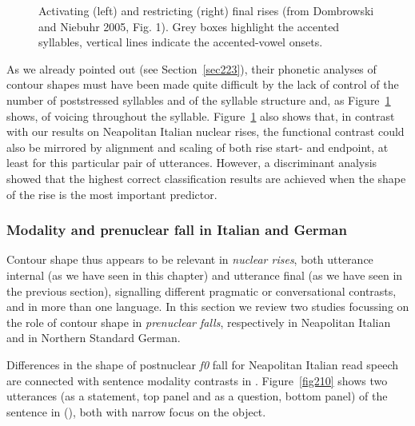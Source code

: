 \begin{figure}
\centering
{}
\caption{Activating (left) and restricting (right) final rises (from Dombrowski and Niebuhr 2005, Fig. 1). Grey boxes highlight the accented syllables, vertical lines indicate the accented-vowel onsets.}
\label{fig209}\end{figure}

As we already pointed out (see Section~\ref{sec223}), their phonetic analyses of contour shapes must have been made quite difficult by the lack of control of the number of poststressed syllables and of the syllable structure and, as Figure~\ref{fig209} shows, of voicing throughout the syllable. Figure~\ref{fig209} also shows that, in contrast with our results on Neapolitan Italian nuclear rises, the functional contrast could also be mirrored by alignment and scaling of both rise start- and endpoint, at least for this particular pair of utterances. However, a discriminant analysis showed that the highest correct classification results are achieved when the shape of the rise is the most important predictor.

\subsubsection{Modality and prenuclear fall in Italian and German}\label{sec2412}
Contour shape thus appears to be relevant in \textit{nuclear rises}, both utterance internal (as we have seen in this chapter) and utterance final (as we have seen in the previous section), signalling different pragmatic or conversational contrasts, and in more than one language. In this section we review two studies focussing on the role of contour shape in \textit{prenuclear falls}, respectively in Neapolitan Italian and in Northern Standard German.

Differences in the shape of postnuclear \textit{f0} fall for Neapolitan Italian read speech are connected with sentence modality contrasts in \citet{petrone2008tonal}. Figure~\ref{fig210} shows two utterances (as a statement, top panel and as a question, bottom panel) of the sentence in (), both with narrow focus on the object. 

